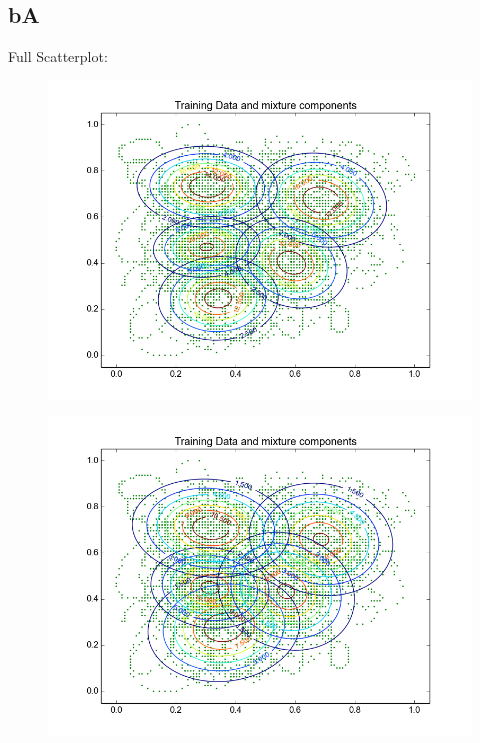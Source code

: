 \documentclass[11pt,a4paper]{article}
\begin{document}
\subsection{bA}
Full Scatterplot: \\
\begin{minipage}[b]{0.25\textwidth}
\begin{figure}[H]
  \centering
  \includegraphics[width=.8\linewidth]{Figures/contours_bA.test0.png}
  \label{fig:sfig1}
\end{figure}%
\end{minipage}
\begin{minipage}[b]{0.25\textwidth}
\begin{figure}[H]
  \centering
  \includegraphics[width=.8\linewidth]{Figures/contours_bA.test5.png}

  \label{fig:sfig1}
\end{figure}%
\end{minipage}
\end{document}
